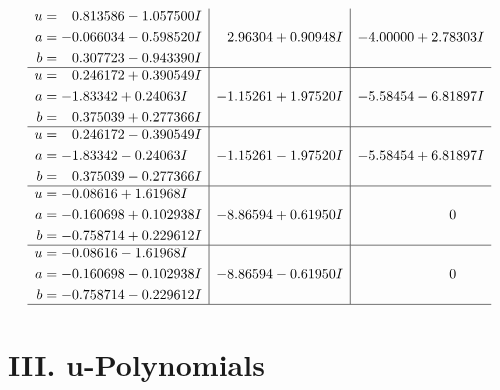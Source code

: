 \documentclass[1p]{elsarticle_modified}
\theoremstyle{definition}
\begin{document}
$$\begin{array}{c|c|c}
\begin{aligned}
u &= \phantom{-}0.813586 - 1.057500 I \\
a &= -0.066034 - 0.598520 I \\
b &= \phantom{-}0.307723 - 0.943390 I\end{aligned}
 & \phantom{-}2.96304 + 0.90948 I & -4.00000 + 2.78303 I \\ \hline\begin{aligned}
u &= \phantom{-}0.246172 + 0.390549 I \\
a &= -1.83342 + 0.24063 I \\
b &= \phantom{-}0.375039 + 0.277366 I\end{aligned}
 & -1.15261 + 1.97520 I & -5.58454 - 6.81897 I \\ \hline\begin{aligned}
u &= \phantom{-}0.246172 - 0.390549 I \\
a &= -1.83342 - 0.24063 I \\
b &= \phantom{-}0.375039 - 0.277366 I\end{aligned}
 & -1.15261 - 1.97520 I & -5.58454 + 6.81897 I \\ \hline\begin{aligned}
u &= -0.08616 + 1.61968 I \\
a &= -0.160698 + 0.102938 I \\
b &= -0.758714 + 0.229612 I\end{aligned}
 & -8.86594 + 0.61950 I & \phantom{-0.000000 } 0 \\ \hline\begin{aligned}
u &= -0.08616 - 1.61968 I \\
a &= -0.160698 - 0.102938 I \\
b &= -0.758714 - 0.229612 I\end{aligned}
 & -8.86594 - 0.61950 I & \phantom{-0.000000 } 0\\
 \hline 
 \end{array}$$\newpage
\newpage\renewcommand{\arraystretch}{1}
\centering \section*{ III. u-Polynomials}
\end{document}
